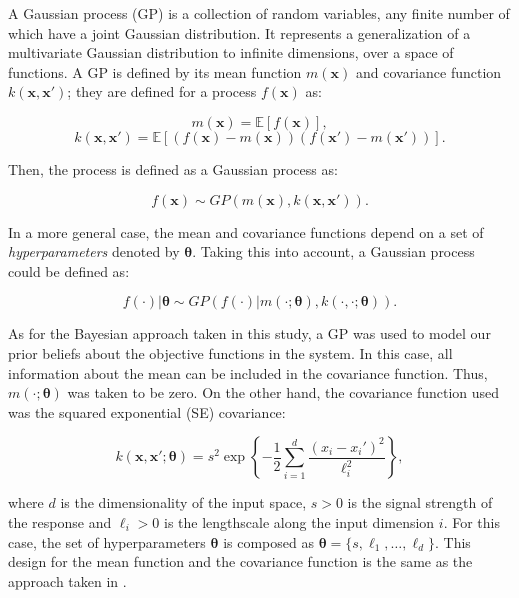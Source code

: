 \documentclass{article}
\begin{document}
A Gaussian process (GP) is a collection of random variables, any finite number of which have a joint Gaussian distribution\cite{Seeger2004}. It represents a generalization of a multivariate Gaussian distribution to infinite dimensions, over a space of functions. A GP is defined by its mean function $m(\textbf{x})$ and covariance function $k(\textbf{x},\textbf{x}')$; they are defined for a process $f(\textbf{x})$ as:

\begin{equation}
    m(\textbf{x}) = \mathbb{E}[f(\textbf{x})],
\end{equation}
\begin{equation}
    k(\textbf{x},\textbf{x}') = \mathbb{E}[(f(\textbf{x})-m(\textbf{x}))(f(\textbf{x}')-m(\textbf{x}'))].
\end{equation}

Then, the process is defined as a Gaussian process as: \cite{Seeger2004}

\begin{equation}
    f(\textbf{x}) \sim GP(m(\textbf{x}), k(\textbf{x},\textbf{x}')).
\end{equation}

In a more general case, the mean and covariance functions depend on a set of \textit{hyperparameters} denoted by $\boldsymbol{\theta}$. Taking this into account, a Gaussian process could be defined as:

\begin{equation}
    f(\cdot)|\boldsymbol{\theta} \sim GP(f(\cdot)|m(\cdot;\boldsymbol{\theta}),k(\cdot,\cdot;\boldsymbol{\theta})).
\end{equation}

As for the Bayesian approach taken in this study, a GP was used to model our prior beliefs about the objective functions in the system. In this case, all information about the mean can be included in the covariance function. Thus, $m(\cdot;\boldsymbol{\theta})$ was taken to be zero. On the other hand, the covariance function used was the squared exponential (SE) covariance:

\begin{equation}
    k(\textbf{x},\textbf{x}';\boldsymbol{\theta}) = s^2 \exp \left \{ -\frac{1}{2}\sum_{i=1}^{d}\frac{(x_i - x_i')^2}{\ell_i^2} \right \},
\end{equation}

where $d$ is the dimensionality of the input space, $s > 0$ is the signal strength of the response and $\ell_i > 0$ is the lengthscale along the input dimension $i$. For this case, the set of hyperparameters $\boldsymbol{\theta}$ is composed as $\boldsymbol{\theta} = \{s, \ell_1, \ldots, \ell_d\}$. This design for the mean function and the covariance function is the same as the approach taken in \cite{Pandita2016}.
\end{document}
